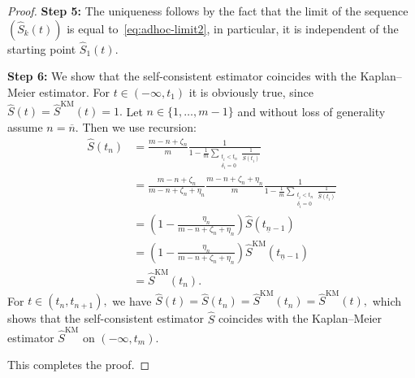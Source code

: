 \documentclass[10pt,a4paper]{amsart}
\renewcommand{\hat}{\widehat}
\def\l{\left}
\def\on{\overline{n}}
\def\r{\right}
\newcommand{\rec}[1]{\frac{1}{#1}}
\def\un{\underline{n}}
\begin{document}
\begin{proof}
\textbf{Step 5:} The uniqueness follows by the fact that the limit of the sequence $\l(\hat{S}_k(t)\r)$ is equal to~\eqref{eq:adhoc-limit2}, in particular, it is independent of the starting point $\hat{S}_1(t).$

\textbf{Step 6:} We show that the self-consistent estimator coincides with the Kaplan--Meier estimator. For $t\in\l(-\infty,t_1\r)$ it is obviously true, since $\hat{S}(t)=\hat{S}^\textrm{KM}(t)=1.$ Let $n\in\{1,\dots, m-1\}$ and without loss of generality assume $n=\on.$ Then we use recursion:
\begin{align*}
 \hat{S}\l(t_n\r) &  =\frac{m-n+\zeta_n}{m} \rec{1-\rec{m}\sum_{\substack{t_i< t_n \\ \delta_i=0}}\rec{\hat{S}\l(t_i\r)}} \\ & = \frac{m-n+\zeta_n}{m-n+\zeta_n+\eta_n} \frac{m-n+\zeta_n+\eta_n}{m} \rec{1-\rec{m}\sum_{\substack{t_i< t_n \\ \delta_i=0}}\rec{\hat{S}\l(t_i\r)}} \\  & = \l(1-\frac{\eta_n}{m-n+\zeta_n+\eta_n}\r)  \hat{S}\l(t_{\un-1}\r) \\ & = \l(1-\frac{\eta_n}{m-n+\zeta_n+\eta_n}\r) \hat{S}^\textrm{KM}\l(t_{\un-1}\r) \\ & = \hat{S}^\textrm{KM}\l(t_n\r).
\end{align*}
For $t\in\l(t_n,t_{n+1}\r),$ we have $\hat{S}(t)=\hat{S}\l(t_n\r)=\hat{S}^\textrm{KM}\l(t_n\r)=\hat{S}^\textrm{KM}(t),$ which shows that the self-consistent estimator $\hat{S}$ coincides with the Kaplan--Meier estimator $\hat{S}^\textrm{KM}$ on $\l(-\infty,t_m\r).$ 

This completes the proof.
\end{proof}
\end{document}
